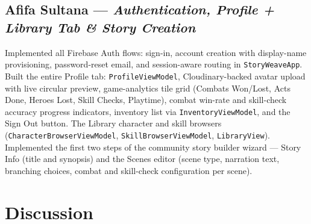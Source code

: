\documentclass[12pt,a4paper]{article}
\begin{document}
\begin{sloppypar}
\subsection*{Afifa Sultana — \textit{Authentication, Profile + Library Tab \& Story Creation}}

Implemented all Firebase Auth flows: sign-in, account creation with display-name provisioning, password-reset email, and session-aware routing in \texttt{StoryWeaveApp}. Built the entire Profile tab: \texttt{ProfileViewModel}, Cloudinary-backed avatar upload with live circular preview, game-analytics tile grid (Combats Won/Lost, Acts Done, Heroes Lost, Skill Checks, Playtime), combat win-rate and skill-check accuracy progress indicators, inventory list via \texttt{InventoryViewModel}, and the Sign Out button. The Library character and skill browsers (\texttt{CharacterBrowserViewModel}, \texttt{SkillBrowserViewModel}, \texttt{LibraryView}). Implemented the first two steps of the community story builder wizard — Story Info (title and synopsis) and the Scenes editor (scene type, narration text, branching choices, combat and skill-check configuration per scene).
\end{sloppypar}

\section{Discussion}
\end{document}
